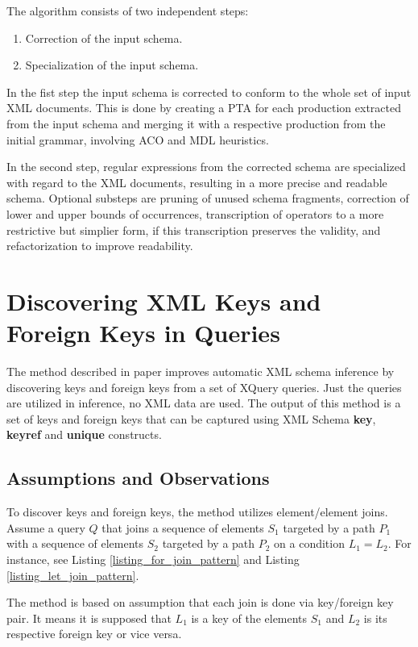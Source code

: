 The algorithm consists of two independent steps:

\begin{enumerate}
\item Correction of the input schema.
\item Specialization of the input schema.
\end{enumerate}

In the fist step the input schema is corrected to conform to the whole set of input XML documents. This is done by creating a PTA for each production extracted from the input schema and merging it with a respective production from the initial grammar, involving ACO and MDL heuristics.

In the second step, regular expressions from the corrected schema are specialized with regard to the XML documents, resulting in a more precise and readable schema. Optional substeps are pruning of unused schema fragments, correction of lower and upper bounds of occurrences, transcription of operators to a more restrictive but simplier form, if this transcription preserves the validity, and refactorization to improve readability.

\section{Discovering XML Keys and Foreign Keys in Queries}
The method described in paper \cite{Necasky:2009:DXK:1529282.1529414} improves automatic XML schema inference by discovering keys and foreign keys from a set of XQuery queries. Just the queries are utilized in inference, no XML data are used. The output of this method is a set of keys and foreign keys that can be captured using XML Schema \textbf{key}, \textbf{keyref} and \textbf{unique} constructs.

\subsection{Assumptions and Observations}
To discover keys and foreign keys, the method utilizes element/element joins. Assume a query $Q$ that joins a sequence of elements $S_1$ targeted by a path $P_1$ with a sequence of elements $S_2$ targeted by a path $P_2$ on a condition $L_1 = L_2$. For instance, see Listing \ref{listing_for_join_pattern} and Listing \ref{listing_let_join_pattern}.

The method is based on assumption that each join is done via key/foreign key pair. It means it is supposed that $L_1$ is a key of the elements $S_1$ and $L_2$ is its respective foreign key or vice versa.

